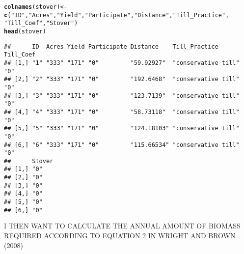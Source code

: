 \documentclass{article}\usepackage[]{graphicx}\usepackage[]{color}
\makeatletter
\newcommand{\hlstr}[1]{\textcolor[rgb]{0.192,0.494,0.8}{#1}}%
\newcommand{\hlstd}[1]{\textcolor[rgb]{0.345,0.345,0.345}{#1}}%
\newcommand{\hlkwb}[1]{\textcolor[rgb]{0.69,0.353,0.396}{#1}}%
\newcommand{\hlkwd}[1]{\textcolor[rgb]{0.737,0.353,0.396}{\textbf{#1}}}%
\newenvironment{kframe}{%
 \def\at@end@of@kframe{}%
 \ifinner\ifhmode%
  \def\at@end@of@kframe{\end{minipage}}%
  \begin{minipage}{\columnwidth}%
 \fi\fi%
 \def\FrameCommand##1{\hskip\@totalleftmargin \hskip-\fboxsep
 \colorbox{shadecolor}{##1}\hskip-\fboxsep
     \hskip-\linewidth \hskip-\@totalleftmargin \hskip\columnwidth}%
 \MakeFramed {\advance\hsize-\width
   \@totalleftmargin\z@ \linewidth\hsize
   \@setminipage}}%
 {\par\unskip\endMakeFramed%
 \at@end@of@kframe}
\newenvironment{knitrout}{}{} %
\makeatother
\begin{document}
\begin{knitrout}
\begin{kframe}
\begin{alltt}
\hlkwd{colnames}\hlstd{(stover)} \hlkwb{<-} \hlkwd{c}\hlstd{(}\hlstr{"ID"}\hlstd{,} \hlstr{"Acres"}\hlstd{,} \hlstr{"Yield"}\hlstd{,} \hlstr{"Participate"}\hlstd{,} \hlstr{"Distance"}\hlstd{,} \hlstr{"Till_Practice"}\hlstd{,}
    \hlstr{"Till_Coef"}\hlstd{,} \hlstr{"Stover"}\hlstd{)}
\hlkwd{head}\hlstd{(stover)}
\end{alltt}
\begin{verbatim}
##      ID  Acres Yield Participate Distance    Till_Practice       Till_Coef
## [1,] "1" "333" "171" "0"         "59.92927"  "conservative till" "0"      
## [2,] "2" "333" "171" "0"         "192.6468"  "conservative till" "0"      
## [3,] "3" "333" "171" "0"         "123.7139"  "conservative till" "0"      
## [4,] "4" "333" "171" "0"         "58.73118"  "conservative till" "0"      
## [5,] "5" "333" "171" "0"         "124.18103" "conservative till" "0"      
## [6,] "6" "333" "171" "0"         "115.66534" "conservative till" "0"      
##      Stover
## [1,] "0"   
## [2,] "0"   
## [3,] "0"   
## [4,] "0"   
## [5,] "0"   
## [6,] "0"
\end{verbatim}
\begin{alltt}

\end{alltt}
\end{kframe}
\end{knitrout}


I THEN WANT TO CALCULATE THE ANNUAL AMOUNT OF BIOMASS REQUIRED ACCORDING TO EQUATION 2 IN WRIGHT AND BROWN (2008)
\end{document}
